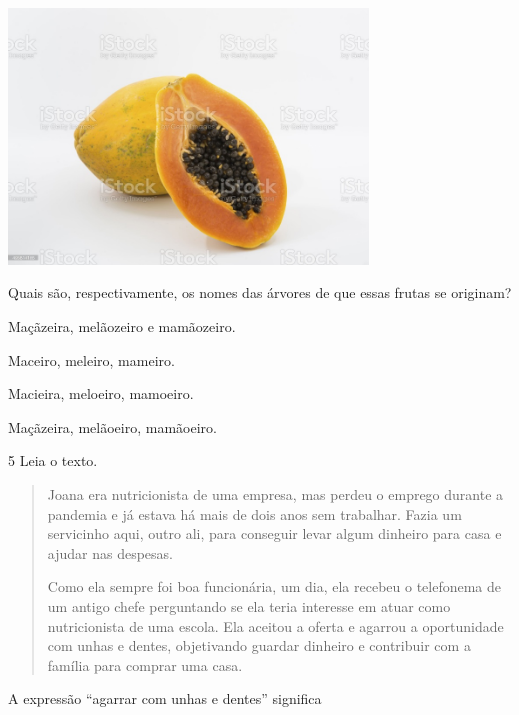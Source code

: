 
\includegraphics[width=3.76501in,height=2.67500in]{./media/image40.jpeg}

Quais são, respectivamente, os nomes das árvores de que essas frutas se originam?

\begin{escolha}
\item Maçãzeira, melãozeiro e mamãozeiro.

\item Maceiro, meleiro, mameiro.

\item Macieira, meloeiro, mamoeiro.

\item Maçãzeira, melãoeiro, mamãoeiro.
\end{escolha}

\num{5} Leia o texto.

\begin{quote}
Joana era nutricionista de uma empresa, mas perdeu o emprego durante a
pandemia e já estava há mais de dois anos sem trabalhar. Fazia um
servicinho aqui, outro ali, para conseguir levar algum dinheiro para
casa e ajudar nas despesas.

Como ela sempre foi boa funcionária, um dia, ela recebeu o telefonema de
um antigo chefe perguntando se ela teria interesse em atuar como
nutricionista de uma escola. Ela aceitou a oferta e agarrou a
oportunidade com unhas e dentes, objetivando guardar dinheiro e
contribuir com a família para comprar uma casa.

\end{quote}

A expressão ``agarrar com unhas e dentes'' significa

